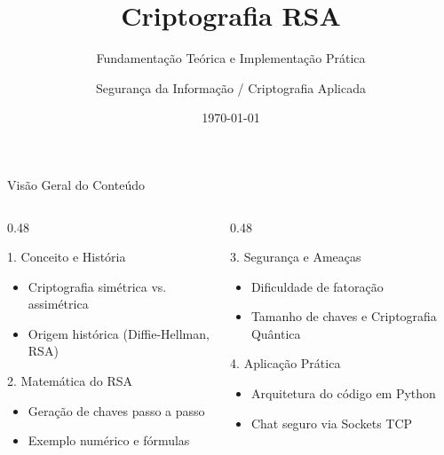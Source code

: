 \documentclass[aspectratio=169, 10pt]{beamer}
\title[Criptografia RSA]{Criptografia RSA}
\subtitle{Fundamentação Teórica e Implementação Prática}
\author{Segurança da Informação / Criptografia Aplicada}
\date{\today}
\begin{document}
\begin{frame}
    \titlepage
\end{frame}

\begin{frame}{Visão Geral do Conteúdo}
    \begin{columns}[T]
        \begin{column}{0.48\textwidth}
            \begin{block}{1. Conceito e História}
                \begin{itemize}
                    \item Criptografia simétrica vs. assimétrica
                    \item Origem histórica (Diffie-Hellman, RSA)
                \end{itemize}
            \end{block}
            \begin{block}{2. Matemática do RSA}
                \begin{itemize}
                    \item Geração de chaves passo a passo
                    \item Exemplo numérico e fórmulas
                \end{itemize}
            \end{block}
        \end{column}
        \begin{column}{0.48\textwidth}
            \begin{block}{3. Segurança e Ameaças}
                \begin{itemize}
                    \item Dificuldade de fatoração
                    \item Tamanho de chaves e Criptografia Quântica
                \end{itemize}
            \end{block}
            \begin{block}{4. Aplicação Prática}
                \begin{itemize}
                    \item Arquitetura do código em Python
                    \item Chat seguro via Sockets TCP
                \end{itemize}
            \end{block}
        \end{column}
    \end{columns}
\end{frame}
\end{document}
